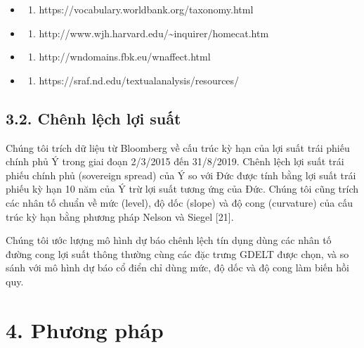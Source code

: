 \begin{itemize}
\item
  \begin{enumerate}
  \def\labelenumi{(\arabic{enumi})}
  \setcounter{enumi}{2}
    \item
    https://vocabulary.worldbank.org/taxonomy.html
  \end{enumerate}
\item
  \begin{enumerate}
  \def\labelenumi{(\arabic{enumi})}
  \setcounter{enumi}{3}
    \item
    http://www.wjh.harvard.edu/\textasciitilde inquirer/homecat.htm
  \end{enumerate}
\item
  \begin{enumerate}
  \def\labelenumi{(\arabic{enumi})}
  \setcounter{enumi}{4}
    \item
    http://wndomains.fbk.eu/wnaffect.html
  \end{enumerate}
\item
  \begin{enumerate}
  \def\labelenumi{(\arabic{enumi})}
  \setcounter{enumi}{5}
    \item
    https://sraf.nd.edu/textualanalysis/resources/
  \end{enumerate}
\end{itemize}

\subsection{3.2. Chênh lệch lợi suất}

Chúng tôi trích dữ liệu từ Bloomberg về cấu trúc kỳ hạn của lợi suất trái phiếu chính phủ Ý trong giai đoạn 2/3/2015 đến 31/8/2019. Chênh lệch lợi suất trái phiếu chính phủ (sovereign spread) của Ý so với Đức được tính bằng lợi suất trái phiếu kỳ hạn 10 năm của Ý trừ lợi suất tương ứng của Đức. Chúng tôi cũng trích các nhân tố chuẩn về mức (level), độ dốc (slope) và độ cong (curvature) của cấu trúc kỳ hạn bằng phương pháp Nelson và Siegel {[}21{]}.

Chúng tôi ước lượng mô hình dự báo chênh lệch tín dụng dùng các nhân tố đường cong lợi suất thông thường cùng các đặc trưng GDELT được chọn, và so sánh với mô hình dự báo cổ điển chỉ dùng mức, độ dốc và độ cong làm biến hồi quy.

\section{4. Phương pháp}

